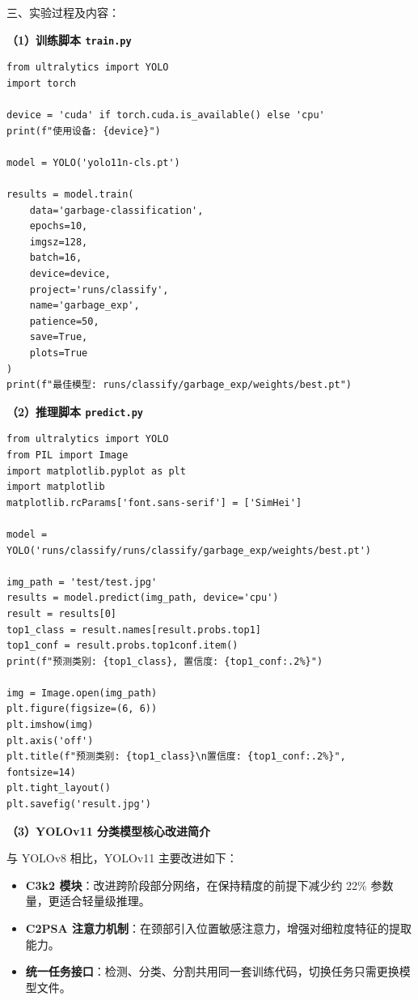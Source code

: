 \documentclass[12pt, a4paper]{article}
\begin{document}
\begin{labbox}{三、实验过程及内容：}{}

\textbf{（1）训练脚本 \texttt{train.py}}

\begin{lstlisting}
from ultralytics import YOLO
import torch

device = 'cuda' if torch.cuda.is_available() else 'cpu'
print(f"使用设备: {device}")

model = YOLO('yolo11n-cls.pt')

results = model.train(
    data='garbage-classification',
    epochs=10,
    imgsz=128,
    batch=16,
    device=device,
    project='runs/classify',
    name='garbage_exp',
    patience=50,
    save=True,
    plots=True
)
print(f"最佳模型: runs/classify/garbage_exp/weights/best.pt")
\end{lstlisting}

\textbf{（2）推理脚本 \texttt{predict.py}}

\begin{lstlisting}
from ultralytics import YOLO
from PIL import Image
import matplotlib.pyplot as plt
import matplotlib
matplotlib.rcParams['font.sans-serif'] = ['SimHei']

model = YOLO('runs/classify/runs/classify/garbage_exp/weights/best.pt')

img_path = 'test/test.jpg'
results = model.predict(img_path, device='cpu')
result = results[0]
top1_class = result.names[result.probs.top1]
top1_conf = result.probs.top1conf.item()
print(f"预测类别: {top1_class}, 置信度: {top1_conf:.2%}")

img = Image.open(img_path)
plt.figure(figsize=(6, 6))
plt.imshow(img)
plt.axis('off')
plt.title(f"预测类别: {top1_class}\n置信度: {top1_conf:.2%}", fontsize=14)
plt.tight_layout()
plt.savefig('result.jpg')
\end{lstlisting}

\textbf{（3）YOLOv11 分类模型核心改进简介}

与 YOLOv8 相比，YOLOv11 主要改进如下：
\begin{itemize}[leftmargin=2em, itemsep=0.2em]
    \item \textbf{C3k2 模块}：改进跨阶段部分网络，在保持精度的前提下减少约 22\% 参数量，更适合轻量级推理。
    \item \textbf{C2PSA 注意力机制}：在颈部引入位置敏感注意力，增强对细粒度特征的提取能力。
    \item \textbf{统一任务接口}：检测、分类、分割共用同一套训练代码，切换任务只需更换模型文件。
\end{itemize}


\end{labbox}
\end{document}
